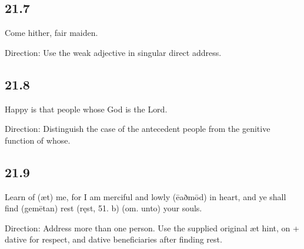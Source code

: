 \subsection*{21.7}

\par\begin{minipage}{\linewidth}\raggedright
Come hither, fair maiden.

Direction: Use the weak adjective in singular direct address.

\end{minipage}\par\addvspace{4pt}

\subsection*{21.8}

\par\begin{minipage}{\linewidth}\raggedright
Happy is that people whose God is the Lord.

Direction: Distinguish the case of the antecedent people from the genitive function of whose.

\end{minipage}\par\addvspace{4pt}

\subsection*{21.9}

\par\begin{minipage}{\linewidth}\raggedright
Learn of (æt) me, for I am merciful and lowly (ēaðmōd) in heart, and ye shall find (gemētan) rest (ręst, 51. b) (om. unto) your souls.

Direction: Address more than one person. Use the supplied original æt hint, on + dative for respect, and dative beneficiaries after finding rest.

\end{minipage}\par\addvspace{4pt}

